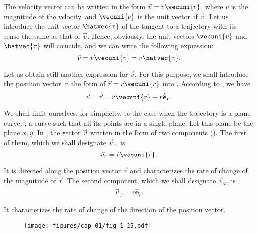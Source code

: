 The velocity vector can be written in the form $\vec{v}=v\vecuni{v}$, where $v$ is the magnitude of the velocity, and $\vecuni{v}$ is the unit vector of $\vec{v}$. Let us introduce the unit vector $\hatvec{\tau}$ of the tangent to a trajectory with its sense the same as that of $\vec{v}$. Hence, obviously, the unit vectors $\vecuni{v}$ and $\hatvec{\tau}$ will coincide, and we can write the following expression:
\vspace{-12pt}
\begin{equation}\label{eq:1_67}
\vec{v} = v\vecuni{v} = v\hatvec{\tau}.
\end{equation}

Let us obtain still another expression for $\vec{v}$. For this purpose, we shall introduce the position vector in the form of $\vec{r}=r\vecuni{r}$ into . According to , we have
\begin{equation}\label{eq:1_68}
\vec{v} = \dot{\vec{r}} = \dot{r}\vecuni{r} + r\dot{\hat{\boldsymbol{e}}}_r.
\end{equation}

\noindent
We shall limit ourselves, for simplicity, to the case when the trajectory is a plane curve, \ie, a curve such that all its points are in a single plane. Let this plane be the plane $x, y$. In , the vector $\vec{v}$ written in the form of two components (). The first of them, which we shall designate $\vec{v}_r$, is
\begin{equation}\label{eq:1_69}
\vec{v}_r = \dot{r}\vecuni{r}.
\end{equation}

\noindent
It is directed along the position vector $\vec{r}$ and characterizes the rate of change of the magnitude of $\vec{r}$. The second component, which we shall designate $\vec{v}_{\varphi}$, is
\begin{equation}\label{eq:1_70}
\vec{v}_{\varphi} = r\dot{\hat{\boldsymbol{e}}}_r.
\end{equation}

\noindent
It characterizes the rate of change of the direction of the position vector. 

\begin{figure}[t]
	\begin{center}
		\texttt{[image: figures/cap\_01/fig\_1\_25.pdf]}
		\caption[]{}
		\label{fig:1_25}
	\end{center}
	\vspace{-0.7cm}
\end{figure}

